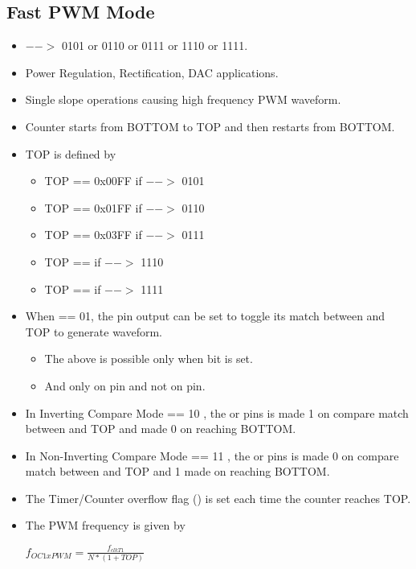 \subsection{Fast PWM Mode}
\begin{itemize}
    \item {} $-->$ 0101 or 0110 or 0111 or 1110 or 1111.
    \item Power Regulation, Rectification, DAC applications.
    \item Single slope operations causing high frequency PWM waveform.
    \item Counter starts from BOTTOM to TOP and then restarts from BOTTOM.
    \item TOP is defined by
    \begin{itemize}
        \item TOP == 0x00FF if  $-->$ 0101
        \item TOP == 0x01FF if  $-->$ 0110
        \item TOP == 0x03FF if  $-->$ 0111
        \item TOP ==    if  $-->$ 1110
        \item TOP ==   if  $-->$ 1111
    \end{itemize}
    \item  When  == 01, the  pin output can be set to toggle its match between  and TOP to generate waveform.
    \begin{itemize}
        \item The above is possible only when  bit is set.
        \item And only on  pin and not on  pin.
    \end{itemize}
    \item In Inverting Compare Mode  == 10 , the  or  pins is made 1 on compare match between  and TOP and made 0 on reaching BOTTOM.
    \item In Non-Inverting Compare Mode  == 11 , the  or  pins is made 0 on compare match between  and TOP and 1 made  on reaching BOTTOM.
    \item The Timer/Counter overflow flag () is set each time the counter reaches TOP.
    \item The PWM frequency is given by 
    \begin{center}
        { \Large $f_{OC1xPWM} = \frac{f_{clkT1}}{N * (1+ TOP)}$ }
    \end{center}
\end{itemize}


